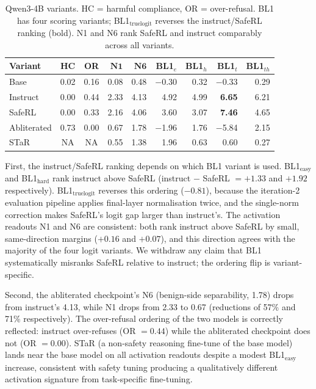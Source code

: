 \documentclass[11pt,letterpaper]{article}
\begin{document}
\begin{table}[!htbp]
\centering
\scriptsize
\caption{Qwen3-4B variants. HC = harmful compliance, OR = over-refusal. BL1 has four scoring variants; BL1$_\text{truelogit}$ reverses the instruct/SafeRL ranking (bold). N1 and N6 rank SafeRL and instruct comparably across all variants.}
\label{tab:qwen}
\begin{tabular}{lccrrrrrr}
\toprule
\textbf{Variant} & \textbf{HC} & \textbf{OR} & $\bm{N1}$ & $\bm{N6}$ & \textbf{BL1$_e$} & \textbf{BL1$_h$} & \textbf{BL1$_t$} & \textbf{BL1$_{th}$} \\
\midrule
Base     & 0.02 & 0.16 & 0.08 & 0.48 & $-$0.30 & 0.32 & $-$0.33 & 0.29 \\
Instruct & 0.00 & 0.44 & 2.33 & 4.13 & 4.92 & 4.99 & \textbf{6.65} & 6.21 \\
SafeRL   & 0.00 & 0.33 & 2.16 & 4.06 & 3.60 & 3.07 & \textbf{7.46} & 4.65 \\
Abliterated & 0.73 & 0.00 & 0.67 & 1.78 & $-$1.96 & 1.76 & $-$5.84 & 2.15 \\
STaR     & NA   & NA   & 0.55 & 1.38 & 1.96 & 0.63 & 0.60 & 0.27 \\
\bottomrule
\end{tabular}
\end{table}

First, the instruct/SafeRL ranking depends on which BL1 variant is used. BL1$_\text{easy}$ and BL1$_\text{hard}$ rank instruct above SafeRL (instruct $-$ SafeRL $= +1.33$ and $+1.92$ respectively). BL1$_\text{truelogit}$ reverses this ordering ($-0.81$), because the iteration-2 evaluation pipeline applies final-layer normalisation twice, and the single-norm correction makes SafeRL's logit gap larger than instruct's. The activation readouts N1 and N6 are consistent: both rank instruct above SafeRL by small, same-direction margins ($+0.16$ and $+0.07$), and this direction agrees with the majority of the four logit variants. We withdraw any claim that BL1 systematically misranks SafeRL relative to instruct; the ordering flip is variant-specific.

Second, the abliterated checkpoint's N6 (benign-side separability, 1.78) drops from instruct's 4.13, while N1 drops from 2.33 to 0.67 (reductions of 57\% and 71\% respectively). The over-refusal ordering of the two models is correctly reflected: instruct over-refuses (OR $= 0.44$) while the abliterated checkpoint does not (OR $= 0.00$). STaR (a non-safety reasoning fine-tune of the base model) lands near the base model on all activation readouts despite a modest BL1$_\text{easy}$ increase, consistent with safety tuning producing a qualitatively different activation signature from task-specific fine-tuning.
\end{document}

